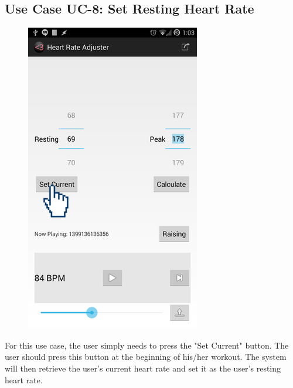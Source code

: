 \documentclass[letterpaper,english, 12pt]{scrreprt}
\begin{document}
\subsection{Use Case UC-8: Set Resting Heart Rate}
\begin{figure}[H]
	\centering
	\includegraphics{img/Prelim_Design/10.png}
\end{figure}

For this use case, the user simply needs to press the "Set Current" button.
The user should press this button at the beginning of his/her workout.
The system will then retrieve the user's current heart rate and set it as the user's resting heart rate.
\end{document}
